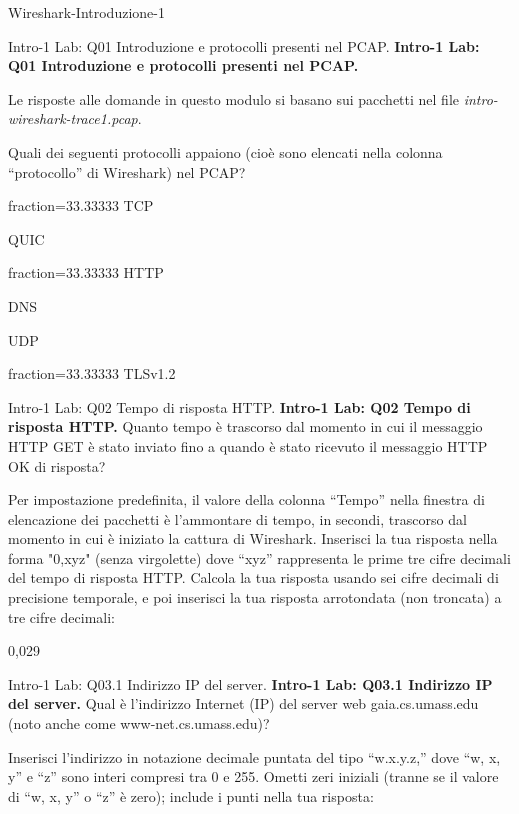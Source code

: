 \documentclass[a4paper]{article}
\begin{document}
\begin{quiz}{Wireshark-Introduzione-1}

\begin{multi}[points=1,multiple]{Intro-1 Lab: Q01 Introduzione e protocolli presenti nel PCAP.}
\textbf{Intro-1 Lab: Q01 Introduzione e protocolli presenti nel PCAP.}

Le risposte alle domande in questo modulo si basano sui pacchetti nel file \emph{intro-wireshark-trace1.pcap}.

Quali dei seguenti protocolli appaiono (cioè sono elencati nella colonna ``protocollo'' di Wireshark) nel PCAP?

\item[fraction=33.33333] TCP
\item QUIC
\item[fraction=33.33333] HTTP
\item DNS
\item UDP
\item[fraction=33.33333] TLSv1.2
\end{multi}

\begin{shortanswer}[points=1]{Intro-1 Lab: Q02 Tempo di risposta HTTP.}
\textbf{Intro-1 Lab: Q02 Tempo di risposta HTTP.}
Quanto tempo è trascorso dal momento in cui il messaggio HTTP GET è stato inviato fino a quando è stato ricevuto il messaggio HTTP OK di risposta?

Per impostazione predefinita, il valore della colonna ``Tempo'' nella finestra di elencazione dei pacchetti è l'ammontare di tempo, in secondi, trascorso dal momento in cui è iniziato la cattura di Wireshark. Inserisci la tua risposta nella forma "0,xyz" (senza virgolette) dove ``xyz'' rappresenta le prime tre cifre decimali del tempo di risposta HTTP. Calcola la tua risposta usando sei cifre decimali di precisione temporale, e poi inserisci la tua risposta arrotondata (non troncata) a tre cifre decimali:

\item 0,029
\end{shortanswer}

\begin{shortanswer}[points=1]{Intro-1 Lab: Q03.1 Indirizzo IP del server.}
\textbf{Intro-1 Lab: Q03.1 Indirizzo IP del server.}
Qual è l'indirizzo Internet (IP) del server web gaia.cs.umass.edu (noto anche come www-net.cs.umass.edu)?

Inserisci l'indirizzo in notazione decimale puntata del tipo ``w.x.y.z,'' dove ``w, x, y'' e ``z'' sono interi compresi tra 0 e 255. Ometti zeri iniziali (tranne se il valore di ``w, x, y'' o ``z'' è zero); include i punti nella tua risposta:


\end{shortanswer}
\end{quiz}
\end{document}
